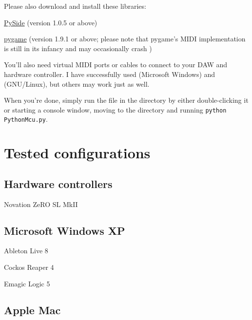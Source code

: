 Please also download and install these libraries:

\begin{compactitem}
\item \href{http://www.pyside.org//}{PySide} (version 1.0.5 or above)
\item \href{http://www.pygame.org/}{pygame} (version 1.9.1 or above;
  please note that pygame's MIDI implementation is still in its
  infancy and may occasionally crash )
\end{compactitem}

You'll also need virtual MIDI ports or cables to connect
 to your DAW and hardware controller.  I have
successfully used  (Microsoft Windows) and
 (GNU/Linux), but others may work just as well.

When you're done, simply run the file  in the
directory  by either double-clicking it or starting a
console window, moving to the directory  and running
\texttt{python PythonMcu.py}.


\chapter{Tested configurations}
\label{chap:tested_configurations}

\section{Hardware controllers}

\begin{compactitem}
\item Novation ZeRO SL MkII
\end{compactitem}

\section{Microsoft Windows XP}

\begin{compactitem}
\item Ableton Live 8
\item Cockos Reaper 4
\item Emagic Logic 5
\end{compactitem}

\section{Apple Mac}

